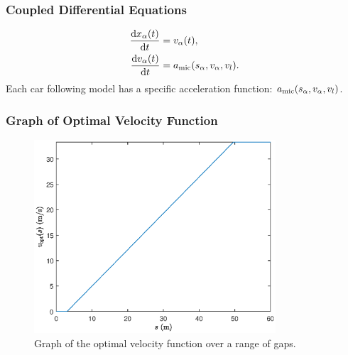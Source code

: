 \documentclass{beamer}
\begin{document}
\begin{frame}
  \frametitle{Coupled Differential Equations}
  \begin{align*} 
    \odv{x_\alpha(t)}{t} &= v_\alpha (t), \\
    \odv{v_\alpha (t)}{t} &= a_{\rm mic} (s_\alpha, v_\alpha, v_l).
  \end{align*}
  Each car following model has a specific acceleration function: $a_{\rm mic} (s_\alpha, v_\alpha, v_l)$.
\end{frame}


\begin{frame}
  \frametitle{Graph of Optimal Velocity Function}
  \begin{figure}[H]
    \includegraphics[width=9cm]{vopt_versus_s.eps}
    \centering
    \caption{Graph of the optimal velocity function over a range of gaps.}
\end{figure}
\end{frame}
\end{document}
